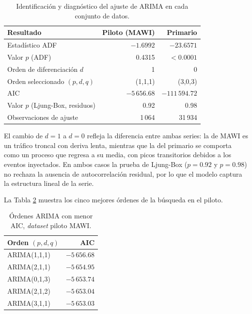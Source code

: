 \documentclass[12pt]{report}
\begin{document}
\begin{table}[H]
    \centering
    \begin{tabular}{|l|r|r|}
        \hline
        \textbf{Resultado} & \textbf{Piloto (MAWI)} & \textbf{Primario} \\
        \hline
        Estadístico ADF & $-1.6992$ & $-23.6571$ \\
        Valor $p$ (ADF) & 0.4315 & $<0.0001$ \\
        Orden de diferenciación $d$ & 1 & 0 \\
        Orden seleccionado $(p,d,q)$ & (1,1,1) & (3,0,3) \\
        AIC & $-5\,656.68$ & $-111\,594.72$ \\
        Valor $p$ (Ljung-Box, residuos) & 0.92 & 0.98 \\
        Observaciones de ajuste & 1\,064 & 31\,934 \\
        \hline
    \end{tabular}
    \caption{Identificación y diagnóstico del ajuste de ARIMA en cada conjunto de datos.}
    \label{tab:ajuste_arima}
\end{table}

El cambio de $d=1$ a $d=0$ refleja la diferencia entre ambas series: la de MAWI es un tráfico troncal con deriva lenta, mientras que la del primario se comporta como un proceso que regresa a su media, con picos transitorios debidos a los eventos inyectados. En ambos casos la prueba de Ljung-Box ($p=0.92$ y $p=0.98$) no rechaza la ausencia de autocorrelación residual, por lo que el modelo captura la estructura lineal de la serie.

La Tabla \ref{tab:busqueda_arima} muestra los cinco mejores órdenes de la búsqueda en el piloto.

\begin{table}[H]
    \centering
    \begin{tabular}{|l|r|}
        \hline
        \textbf{Orden $(p,d,q)$} & \textbf{AIC} \\
        \hline
        ARIMA(1,1,1) & \textbf{$-5\,656.68$} \\
        ARIMA(2,1,1) & $-5\,654.95$ \\
        ARIMA(0,1,3) & $-5\,653.74$ \\
        ARIMA(2,1,2) & $-5\,653.04$ \\
        ARIMA(3,1,1) & $-5\,653.03$ \\
        \hline
    \end{tabular}
    \caption{Órdenes ARIMA con menor AIC, \textit{dataset} piloto MAWI.}
    \label{tab:busqueda_arima}
\end{table}
\end{document}
